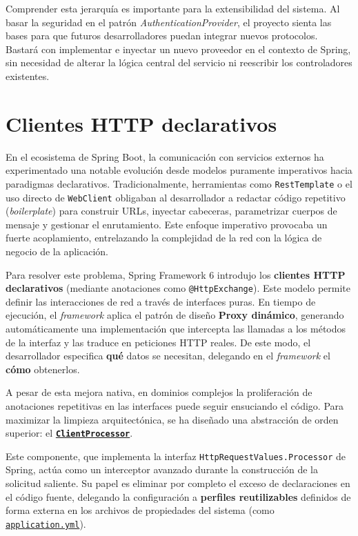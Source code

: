 Comprender esta jerarquía es importante para la extensibilidad del sistema. Al basar la seguridad en el patrón \textit{AuthenticationProvider}, el proyecto sienta las bases para que futuros desarrolladores puedan integrar nuevos protocolos. Bastará con implementar e inyectar un nuevo proveedor en el contexto de Spring, sin necesidad de alterar la lógica central del servicio ni reescribir los controladores existentes.

\section{Clientes HTTP declarativos}

En el ecosistema de Spring Boot, la comunicación con servicios externos ha experimentado una notable evolución desde modelos puramente imperativos hacia paradigmas declarativos. Tradicionalmente, herramientas como \texttt{RestTemplate} o el uso directo de \texttt{WebClient} obligaban al desarrollador a redactar código repetitivo (\textit{boilerplate}) para construir URLs, inyectar cabeceras, parametrizar cuerpos de mensaje y gestionar el enrutamiento. Este enfoque imperativo provocaba un fuerte acoplamiento, entrelazando la complejidad de la red con la lógica de negocio de la aplicación.

Para resolver este problema, Spring Framework 6 introdujo los \textbf{clientes HTTP declarativos} (mediante anotaciones como \texttt{@HttpExchange}). Este modelo permite definir las interacciones de red a través de interfaces puras. En tiempo de ejecución, el \textit{framework} aplica el patrón de diseño \textbf{Proxy dinámico}, generando automáticamente una implementación que intercepta las llamadas a los métodos de la interfaz y las traduce en peticiones HTTP reales. De este modo, el desarrollador especifica \textbf{qué} datos se necesitan, delegando en el \textit{framework} el \textbf{cómo} obtenerlos.

A pesar de esta mejora nativa, en dominios complejos la proliferación de anotaciones repetitivas en las interfaces puede seguir ensuciando el código. Para maximizar la limpieza arquitectónica, se ha diseñado una abstracción de orden superior: el \href{https://github.com/verteramo/UBUMonitorWeb/blob/main/api/src/main/kotlin/es/ubu/lsi/ubumonitorweb/core/client/ClientProcessor.kt#L26}{\textbf{\texttt{ClientProcessor}}}.

Este componente, que implementa la interfaz \texttt{HttpRequestValues.Processor} de Spring, actúa como un interceptor avanzado durante la construcción de la solicitud saliente. Su papel es eliminar por completo el exceso de declaraciones en el código fuente, delegando la configuración a \textbf{perfiles reutilizables} definidos de forma externa en los archivos de propiedades del sistema (como \href{https://github.com/verteramo/UBUMonitorWeb/blob/main/api/src/main/resources/application.yaml#L49}{\texttt{application.yml}}).

